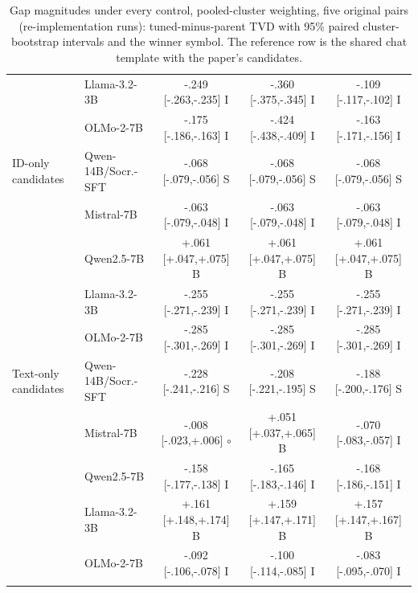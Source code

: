 \begin{table}[t]
\begin{tabular}{@{}llccc@{}}
 & Llama-3.2-3B & -.249 [-.263,-.235] I & -.360 [-.375,-.345] I & -.109 [-.117,-.102] I \\
 & OLMo-2-7B & -.175 [-.186,-.163] I & -.424 [-.438,-.409] I & -.163 [-.171,-.156] I \\
\addlinespace[1pt]
ID-only candidates & Qwen-14B/Socr.-SFT & -.068 [-.079,-.056] S & -.068 [-.079,-.056] S & -.068 [-.079,-.056] S \\
 & Mistral-7B & -.063 [-.079,-.048] I & -.063 [-.079,-.048] I & -.063 [-.079,-.048] I \\
 & Qwen2.5-7B & +.061 [+.047,+.075] B & +.061 [+.047,+.075] B & +.061 [+.047,+.075] B \\
 & Llama-3.2-3B & -.255 [-.271,-.239] I & -.255 [-.271,-.239] I & -.255 [-.271,-.239] I \\
 & OLMo-2-7B & -.285 [-.301,-.269] I & -.285 [-.301,-.269] I & -.285 [-.301,-.269] I \\
\addlinespace[1pt]
Text-only candidates & Qwen-14B/Socr.-SFT & -.228 [-.241,-.216] S & -.208 [-.221,-.195] S & -.188 [-.200,-.176] S \\
 & Mistral-7B & -.008 [-.023,+.006] $\circ$ & +.051 [+.037,+.065] B & -.070 [-.083,-.057] I \\
 & Qwen2.5-7B & -.158 [-.177,-.138] I & -.165 [-.183,-.146] I & -.168 [-.186,-.151] I \\
 & Llama-3.2-3B & +.161 [+.148,+.174] B & +.159 [+.147,+.171] B & +.157 [+.147,+.167] B \\
 & OLMo-2-7B & -.092 [-.106,-.078] I & -.100 [-.114,-.085] I & -.083 [-.095,-.070] I \\
\addlinespace[1pt]
\bottomrule
\end{tabular}
\caption{Gap magnitudes under every control, pooled-cluster weighting, five original pairs (re-implementation runs): tuned-minus-parent TVD with 95\% paired cluster-bootstrap intervals and the winner symbol. The reference row is the shared chat template with the paper's candidates.}
\label{tab:controls-gaps-pc}
\end{table}
